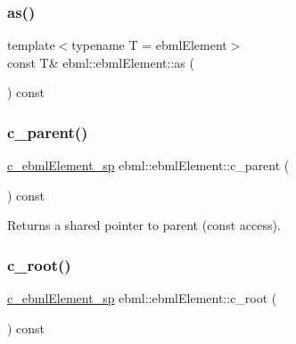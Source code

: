 \mbox{\label{classebml_1_1ebmlElement_a5187388f244c6432a6ba89eac91e20ea}} 
\subsubsection{\texorpdfstring{as()}{as()}\hspace{0.1cm}{\footnotesize\ttfamily [2/2]}}
{\footnotesize\ttfamily template$<$typename T  = ebml\+Element$>$ \\
const T\& ebml\+::ebml\+Element\+::as (\begin{DoxyParamCaption}{ }\end{DoxyParamCaption}) const\hspace{0.3cm}{\ttfamily [inline]}}

\mbox{\label{classebml_1_1ebmlElement_a1254e41a77ff0157b76db8f33ad7d229}} 
\subsubsection{\texorpdfstring{c\+\_\+parent()}{c\_parent()}}
{\footnotesize\ttfamily \mbox{\hyperlink{namespaceebml_a2deef4e8071531b32e3533f1bf978917}{c\+\_\+ebml\+Element\+\_\+sp}} ebml\+::ebml\+Element\+::c\+\_\+parent (\begin{DoxyParamCaption}{ }\end{DoxyParamCaption}) const}

Returns a shared pointer to parent (const access). \mbox{\label{classebml_1_1ebmlElement_a3dddd3edbb6c96b8765107fccad5826b}} 
\subsubsection{\texorpdfstring{c\+\_\+root()}{c\_root()}}
{\footnotesize\ttfamily \mbox{\hyperlink{namespaceebml_a2deef4e8071531b32e3533f1bf978917}{c\+\_\+ebml\+Element\+\_\+sp}} ebml\+::ebml\+Element\+::c\+\_\+root (\begin{DoxyParamCaption}{ }\end{DoxyParamCaption}) const}

